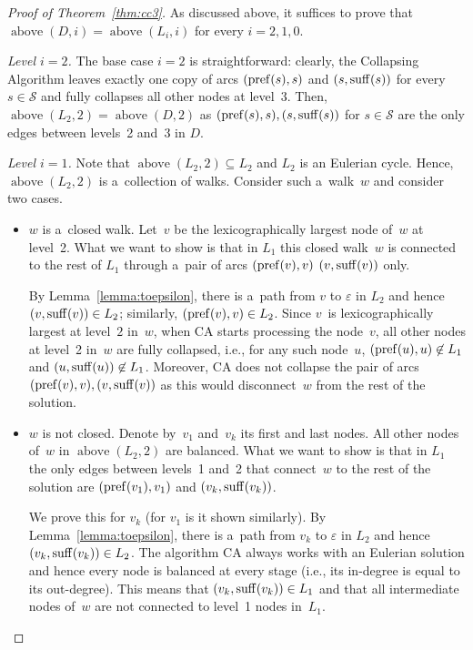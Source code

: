 \begin{proof}[Proof of Theorem~\ref{thm:cc3}]
As discussed above, it suffices to prove that $\operatorname{above}(D,i)=\operatorname{above}(L_i, i)$ for every $i=2,1,0$.

\begin{description}
\item {\em Level $i=2$.} The base case $i=2$ is straightforward: clearly, the Collapsing Algorithm leaves exactly one copy of arcs $(\operatorname{pref}(s), s)$ and $(s, \operatorname{suff}(s))$ for every $s \in \mathcal{S}$ and fully collapses all other nodes at level~$3$. Then, $\operatorname{above}(L_2,2)=\operatorname{above}(D,2)$ as $(\operatorname{pref}(s), s), (s, \operatorname{suff}(s))$ for $s \in \mathcal{S}$ are the only edges between levels~2 and~3 in $D$.

\item {\em Level $i=1$.} Note that $\operatorname{above}(L_2,2) \subseteq L_2$ and $L_2$ is an Eulerian cycle. Hence, $\operatorname{above}(L_2,2)$ is a~collection of walks. Consider such a~walk~$w$ and consider two cases.
\begin{itemize}
\item $w$ is a~closed walk. Let~$v$ be the lexicographically largest node of~$w$ at level~2. What we want to show is that in $L_1$ this closed walk~$w$ is connected to the rest of $L_1$ through a~pair of arcs $(\operatorname{pref}(v), v)$ $(v, \operatorname{suff}(v))$ only.

By Lemma~\ref{lemma:toepsilon}, there is a~path from $v$ to $\varepsilon$ in $L_2$ and hence $(v, \operatorname{suff}(v)) \in L_2$; similarly, $(\operatorname{pref}(v), v) \in L_2$. Since $v$~is lexicographically largest at level~$2$ in~$w$, when CA starts processing the node~$v$, all other nodes at level~2 in~$w$ are fully collapsed, i.e., for any such node~$u$, $(\operatorname{pref}(u), u) \not \in L_1$ and $(u, \operatorname{suff}(u)) \not \in  L_1$. Moreover, CA does not collapse the pair of arcs 
$(\operatorname{pref}(v), v), (v, \operatorname{suff}(v))$ as this would disconnect~$w$ from the rest of the solution.

\item $w$ is not closed. Denote by~$v_1$ and~$v_k$ its first and last nodes. All other nodes of~$w$ in $\operatorname{above}(L_2,2)$ are balanced. What we want to show is that in $L_1$ the only edges between levels~1 and~2 that connect~$w$ to the rest of the solution are $(\operatorname{pref}(v_1), v_1)$ and $(v_k, \operatorname{suff}(v_k))$.

We prove this for $v_k$ (for $v_1$ is it shown similarly). By Lemma~\ref{lemma:toepsilon}, there is a~path from $v_k$ to $\varepsilon$ in $L_2$ and hence $(v_k, \operatorname{suff}(v_k)) \in L_2$. The algorithm CA always works with an Eulerian solution and hence every node is balanced at every stage (i.e., its in-degree is equal to its out-degree). This means that $(v_k, \operatorname{suff}(v_k)) \in L_1$ and that all intermediate nodes of~$w$ are not connected to level~1 nodes in~$L_1$.
\end{itemize}


\end{description}
\end{proof}
